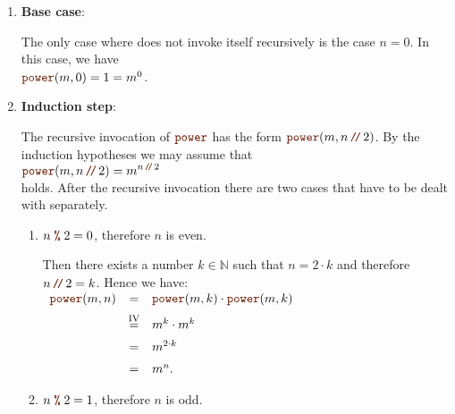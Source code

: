 \begin{enumerate}
\item \textbf{Base case}:

      The only case where  does not invoke itself recursively is the case $n = 0$.  
      In this case, we have
      \\[0.2cm]
      \hspace*{1.3cm} 
      $\mytt{power}(m,0) = 1 =  m^0$. \mycheck
\item \textbf{Induction step}:

      The recursive invocation of $\mytt{power}$ has the form
      $\mytt{power}(m,n \dv 2)$.  By the induction hypotheses we may assume that 
      \\[0.2cm]
      \hspace*{1.3cm}
      $\displaystyle \mytt{power}(m,n \dv 2) = m^{n \dvv 2}$ 
      \\[0.2cm]
      holds.  After the recursive invocation there are two cases that have to be dealt with separately.
      \begin{enumerate}
      \item $n \;\mytt{\%}\; 2 = 0$, therefore $n$ is even.

            Then there exists a number $k \in \mathbb{N}$ such that $n = 2 \cdot k$ and therefore
            $n \dv 2 = k$.
            Hence we have:
            \\[0.2cm]
            \hspace*{1.3cm}
           $ 
            \begin{array}{lcl}
            \mytt{power}(m,n) & = & \mytt{power}(m,k) \cdot \mytt{power}(m,k) \\[0.2cm]
                                & \stackrel{\mathrm{IV}}{=} & m^k \cdot m^k  \\[0.2cm]
                                & = & m^{2\cdot k} \\[0.2cm]
                                & = & m^{n}.
            \end{array}
            $            
      \item $n \;\mytt{\%}\; 2 = 1$, therefore $n$ is odd.


\end{enumerate}
\end{enumerate}
